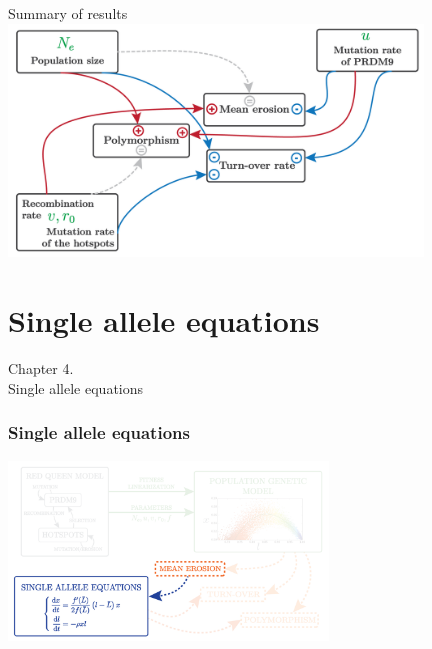 \documentclass[10pt]{beamer}
\begin{document}
\begin{frame}
	\begin{center}
		\Large
		Summary of results
       \includegraphics[width=11cm]{Images/summary.png}
	\end{center}
\end{frame}

\section{Single allele equations}

\begin{frame}
	\begin{center}
	\huge
	Chapter 4. \\
       Single allele equations
	\end{center}
\end{frame}

\begin{frame}
\frametitle{Single allele equations}
	\begin{center}
       \includegraphics[width=8.5cm]{Images/overline-4.png}
	\end{center}
\end{frame}
\end{document}
